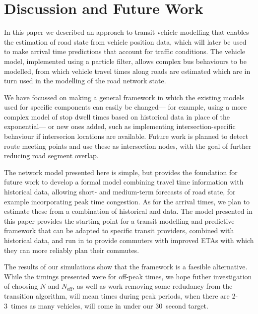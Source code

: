 \section{Discussion and Future Work}
\label{sec:discussion}

In this paper we described an approach to transit vehicle modelling
that enables the \rt estimation of road state from vehicle position data,
which will later be used to make arrival time predictions
that account for \rt traffic conditions.
The vehicle model, implemented using a particle filter,
allows complex bus behaviours to be modelled,
from which 
vehicle travel times along roads are estimated which are in turn used 
in the modelling of the road network state.


We have focussed on making a general framework
in which the existing models used for specific components
can easily be changed---%
for example, using a more complex model of stop dwell times
based on historical data in place of the exponential---%
or new ones added, such as implementing intersection-specific behaviour
if intersecion locations are available.
Future work is planned to detect route meeting points
and use these as intersection nodes,
with the goal of further reducing road segment overlap.


The network model presented here is simple, 
but provides the foundation for future work to
develop a formal model combining \rt travel time information with historical data, 
allowing short- and medium-term forecasts of road state,
for example incorporating peak time congestion.
As for the arrival times, 
we plan to estimate these from a combination of historical 
and \rt data.
The model presented in this paper provides the starting point
for a transit modelling and predictive framework
that can be adapted to specific transit providers,
combined with historical data,
and run in \rt to provide commuters with
improved ETAs with which they can more reliably
plan their commutes.


The results of our simulations show that the framework is a 
faesible \rt alternative.
While the timings presented were for off-peak times,
we hope futher investigation of choosing $N$ and $N_\text{eff}$,
as well as work removing some redudancy from the transition algorithm,
will mean times during peak periods, when there are 2-3~times
as many vehicles, will come in under our 30~second target.
